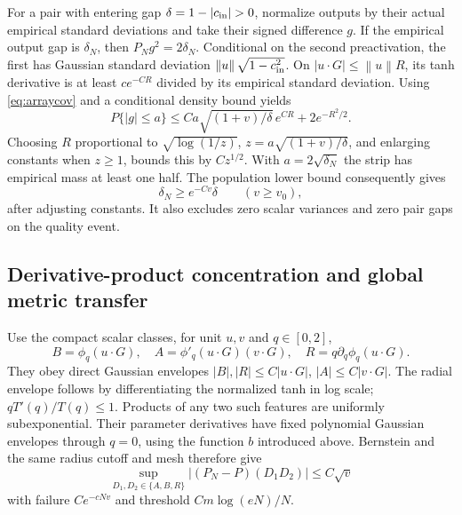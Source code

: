 \documentclass[11pt]{article}
\newcommand{\norm}[1]{\left\lVert#1\right\rVert}
\begin{document}
For a pair with entering gap $\delta=1-|c_{\rm in}|>0$, normalize outputs by their actual empirical standard deviations and take their signed difference $g$. If the empirical output gap is $\delta_N$, then $P_Ng^2=2\delta_N$. Conditional on the second preactivation, the first has Gaussian standard deviation $\norm u\sqrt{1-c_{\rm in}^2}$. On $|u\cdot G|\le\norm u R$, its tanh derivative is at least $ce^{-CR}$ divided by its empirical standard deviation. Using \eqref{eq:arraycov} and a conditional density bound yields
\[
 P\{|g|\le a\}\le Ca\sqrt{(1+v)/\delta}\,e^{CR}+2e^{-R^2/2}.
\]
Choosing $R$ proportional to $\sqrt{\log(1/z)}$, $z=a\sqrt{(1+v)/\delta}$, and enlarging constants when $z\ge1$, bounds this by $Cz^{1/2}$. With $a=2\sqrt{\delta_N}$ the strip has empirical mass at least one half. The population lower bound consequently gives
\begin{equation}
 \delta_N\ge e^{-Cv}\delta\qquad(v\ge v_0),
\end{equation}
after adjusting constants. It also excludes zero scalar variances and zero pair gaps on the quality event.

\subsection{Derivative-product concentration and global metric transfer}
Use the compact scalar classes, for unit $u,v$ and $q\in[0,2]$,
\begin{equation}\label{eq:classes}
 B=\phi_q(u\cdot G),\quad A=\phi'_q(u\cdot G)(v\cdot G),\quad
 R=q\partial_q\phi_q(u\cdot G).
\end{equation}
They obey direct Gaussian envelopes $|B|,|R|\le C|u\cdot G|$, $|A|\le C|v\cdot G|$. The radial envelope follows by differentiating the normalized tanh in log scale; $qT'(q)/T(q)\le1$. Products of any two such features are uniformly subexponential. Their parameter derivatives have fixed polynomial Gaussian envelopes through $q=0$, using the function $b$ introduced above. Bernstein and the same radius cutoff and mesh therefore give
\begin{equation}\label{eq:prodconc}
 \sup_{D_1,D_2\in\{A,B,R\}}|(P_N-P)(D_1D_2)|\le C\sqrt v
\end{equation}
with failure $Ce^{-cNv}$ and threshold $Cm\log(eN)/N$.
\end{document}
